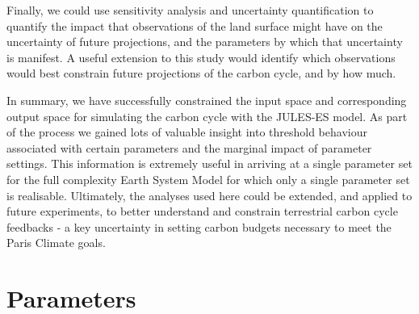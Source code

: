 \documentclass[gmd, manuscript]{copernicus}
\begin{document}
Finally, we could use sensitivity analysis and uncertainty quantification to quantify the impact that observations of the land surface might have on the uncertainty of future projections, and the parameters by which that uncertainty is manifest.
A useful extension to this study would identify which observations would best constrain future projections of the carbon cycle, and by how much.

In summary, we have successfully constrained the input space and corresponding output space for simulating the carbon cycle with the JULES-ES model. As part of the process we gained lots of valuable insight into threshold behaviour associated with certain parameters and the marginal impact of parameter settings. This information is extremely useful in arriving at a single parameter set for the full complexity Earth System Model for which only a single parameter set is realisable. Ultimately, the analyses used here could be extended, and applied to future experiments, to better understand and constrain terrestrial carbon cycle feedbacks - a key uncertainty in setting carbon budgets necessary to meet the Paris Climate goals.
    


\appendix

\section{Parameters}\label{sec:app_parameters}
\end{document}
